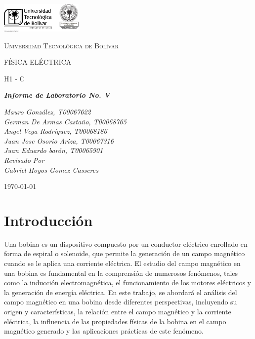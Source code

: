 \documentclass[twocolumn, 12pt]{article}
\begin{document}
\begin{titlepage}
	\centering
	\includegraphics[width=0.3\textwidth]{Images/logo_utb.png}\par\vspace{1cm}
	{\scshape\LARGE Universidad Tecnológica de Bolívar \par}
	\vspace{1cm}

	{\scshape\Large FÍSICA ELÉCTRICA \par}
	\vspace{.2cm}

	{\scshape\Large H1 - C \par}
	\vspace{1cm}
	\slshape {\Large \bfseries{}Informe de Laboratorio No. V\\}
	\vspace{1cm}

	\slshape {\itshape{} Mauro González, T00067622 \\}
	\slshape {\itshape{} German De Armas Castaño, T00068765 \\}
	\slshape {\itshape{} Angel Vega Rodriguez, T00068186 \\}
	\slshape {\itshape{} Juan Jose Osorio Ariza, T00067316 \\}
	\slshape {\itshape{} Juan Eduardo barón, T00065901 \\}
	\vfill
	Revisado Por \\
	Gabriel Hoyos Gomez Casseres\\
	{\large \today\par}
\end{titlepage}

\section{Introducción}

Una bobina es un dispositivo compuesto por un conductor
eléctrico enrollado en forma de espiral o solenoide, que
permite la generación de un campo magnético cuando se le
aplica una corriente eléctrica. El estudio del campo
magnético en una bobina es fundamental en la comprensión de
numerosos fenómenos, tales como la inducción
electromagnética, el funcionamiento de los motores
eléctricos y la generación de energía eléctrica. En este
trabajo, se abordará el análisis del campo magnético en una
bobina desde diferentes perspectivas, incluyendo su origen
y características, la relación entre el campo magnético y
la corriente eléctrica, la influencia de las propiedades
físicas de la bobina en el campo magnético generado y las
aplicaciones prácticas de este fenómeno.
\end{document}
